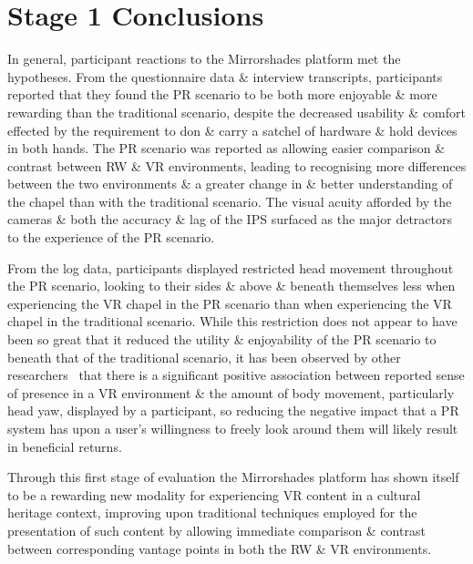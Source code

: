 
\section{Stage 1 Conclusions}

In general, participant reactions to the Mirrorshades platform met the hypotheses. From the questionnaire data \& interview transcripts, participants reported that they found the PR scenario to be both more enjoyable \& more rewarding than the traditional scenario, despite the decreased usability \& comfort effected by the requirement to don \& carry a satchel of hardware \& hold devices in both hands. The PR scenario was reported as allowing easier comparison \& contrast between RW \& VR environments, leading to recognising more differences between the two environments \& a greater change in \& better understanding of the chapel than with the traditional scenario. The visual acuity afforded by the cameras \& both the accuracy \& lag of the IPS surfaced as the major detractors to the experience of the PR scenario.

From the log data, participants displayed restricted head movement throughout the PR scenario, looking to their sides \& above \& beneath themselves less when experiencing the VR chapel in the PR scenario than when experiencing the VR chapel in the traditional scenario. While this restriction does not appear to have been so great that it reduced the utility \& enjoyability of the PR scenario to beneath that of the traditional scenario, it has been observed by other researchers~\cite{Slater1998} that there is a significant positive association between reported sense of presence in a VR environment \& the amount of body movement, particularly head yaw, displayed by a participant, so reducing the negative impact that a PR system has upon a user's willingness to freely look around them will likely result in beneficial returns.

Through this first stage of evaluation the Mirrorshades platform has shown itself to be a rewarding new modality for experiencing VR content in a cultural heritage context, improving upon traditional techniques employed for the presentation of such content by allowing immediate comparison \& contrast between corresponding vantage points in both the RW \& VR environments.


